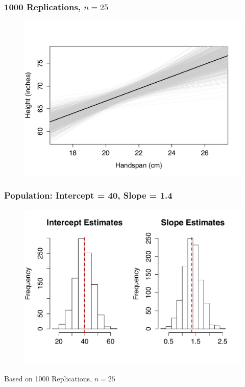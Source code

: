 \begin{frame}
\frametitle{1000 Replications, $n=25$}

\begin{figure}[h]
\centering
\includegraphics[scale = 0.6]{./images/reg_lines_sim}

\end{figure}


\end{frame}


\begin{frame}
\frametitle{Population: Intercept = 40, Slope = 1.4}

\begin{figure}[h]
\centering
\includegraphics[scale = 0.55]{./images/reg_sim_hist}

\end{figure}
\alert{Based on 1000 Replications, $n = 25$}

\end{frame}

